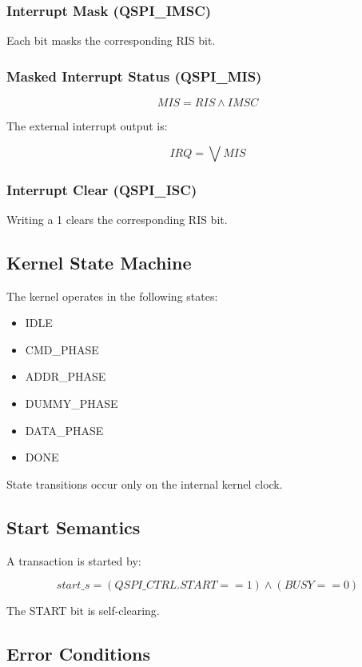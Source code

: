 \subsubsection{Interrupt Mask (QSPI\_IMSC)}

Each bit masks the corresponding RIS bit.

\subsubsection{Masked Interrupt Status (QSPI\_MIS)}

\[
MIS = RIS \land IMSC
\]

The external interrupt output is:

\[
IRQ = \bigvee MIS
\]

\subsubsection{Interrupt Clear (QSPI\_ISC)}

Writing a 1 clears the corresponding RIS bit.

\subsection{Kernel State Machine}

The kernel operates in the following states:

\begin{itemize}
  \item IDLE
  \item CMD\_PHASE
  \item ADDR\_PHASE
  \item DUMMY\_PHASE
  \item DATA\_PHASE
  \item DONE
\end{itemize}

State transitions occur only on the internal kernel clock.

\subsection{Start Semantics}

A transaction is started by:

\[
start\_s = (QSPI\_CTRL.START == 1) \land (BUSY == 0)
\]

The START bit is self-clearing.

\subsection{Error Conditions}

